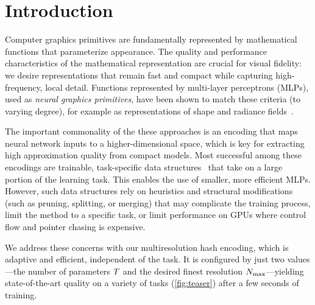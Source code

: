 \documentclass[acmtog,authorversion]{acmart}
\begin{document}
\maketitle

\section{Introduction}

Computer graphics primitives are fundamentally represented by mathematical functions that parameterize appearance.
The quality and performance characteristics of the mathematical representation are crucial for visual fidelity: we desire representations that remain fast and compact while capturing high-frequency, local detail.
Functions represented by multi-layer perceptrons (MLPs), used as \emph{neural graphics primitives}, have been shown to match these criteria (to varying degree), for example as representations of shape \cite{park2019deepsdf,martel2021acorn} and radiance fields~\cite{mildenhall2020nerf,liu2020neural,mueller2020neural,mueller2021realtime}.

The important commonality of the these approaches is an encoding that maps neural network inputs to a higher-dimensional space, which is key for extracting high approximation quality from compact models.
Most successful among these encodings are trainable, task-specific data structures~\cite{takikawa2021nglod,liu2020neural} that take on a large portion of the learning task.
This enables the use of smaller, more efficient MLPs.
However, such data structures rely on heuristics and structural modifications (such as pruning, splitting, or merging) that may complicate the training process, limit the method to a specific task, or limit performance on GPUs where control flow and pointer chasing is expensive.

We address these concerns with our multiresolution hash encoding, which is adaptive and efficient, independent of the task.
It is configured by just two values---the number of parameters $T$ and the desired finest resolution $N_\mathrm{max}$---yielding state-of-the-art quality on a variety of tasks (\autoref{fig:teaser}) after a few seconds of training.
\end{document}
